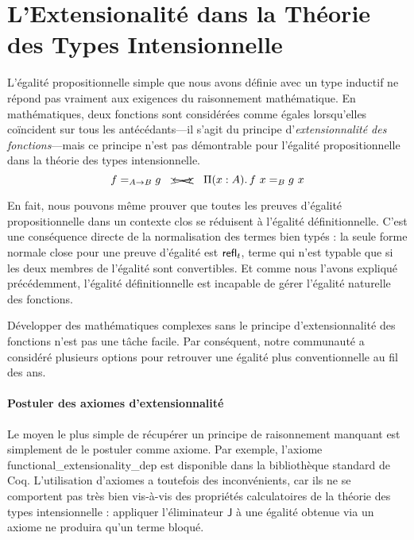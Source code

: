 \section{L'Extensionalité dans la Théorie des Types Intensionnelle}

L'égalité propositionnelle simple que nous avons définie avec un type inductif 
ne répond pas vraiment aux exigences du raisonnement mathématique. 
% 
En mathématiques, deux fonctions sont considérées comme égales lorsqu'elles 
coïncident sur tous les antécédants---il s'agit du principe 
d'\emph{extensionnalité des fonctions}---mais
% 
% 
ce principe n'est pas démontrable pour l'égalité propositionnelle dans 
la théorie des types intensionnelle.
\[
  \Indeq{A \to B}{f}{g} \quad \xcancel{\longleftrightarrow} \quad \Depfun{A}{\Indeq{B}{f\ x}{g\ x}}
\]

En fait, nous pouvons même prouver que toutes les preuves d'égalité 
propositionnelle dans un contexte clos se réduisent à l'égalité définitionnelle. 
% 
C'est une conséquence directe de la normalisation des termes bien typés : 
la seule forme normale close pour une preuve d'égalité est \( \mathsf{refl}_{t} \), 
terme qui n'est typable que si les deux membres de l'égalité sont convertibles. 
% 
Et comme nous l'avons expliqué précédemment, l'égalité définitionnelle est 
incapable de gérer l'égalité naturelle des fonctions. 

Développer des mathématiques complexes sans le principe d'extensionnalité 
des fonctions n'est pas une tâche facile. Par conséquent, notre communauté a 
considéré plusieurs options pour retrouver une égalité plus conventionnelle au 
fil des ans.

\paragraph*{Postuler des axiomes d'extensionnalité}
% 
Le moyen le plus simple de récupérer un principe de raisonnement manquant 
est simplement de le postuler comme axiome. 
% 
% 
Par exemple, l'axiome \textsf{functional\_extensionality\_dep} est disponible 
dans la bibliothèque standard de Coq. 
% 
L'utilisation d'axiomes a toutefois des inconvénients, car ils ne se comportent 
pas très bien vis-à-vis des propriétés calculatoires de la théorie des types 
intensionnelle : appliquer l'éliminateur \( \mathsf{J} \) à une égalité obtenue 
via un axiome ne produira qu'un terme bloqué.

